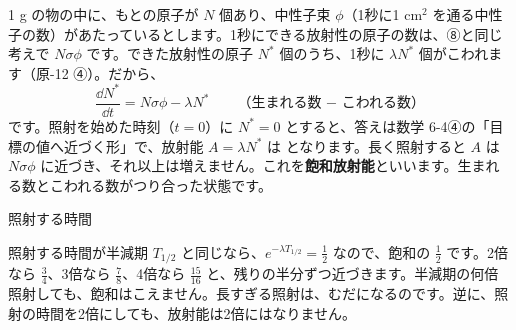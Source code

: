 1 g の物の中に、もとの原子が $N$ 個あり、中性子束 $\phi$（1秒に1 cm$^2$ を通る中性子の数）があたっているとします。1秒にできる放射性の原子の数は、⑧と同じ考えで $N\sigma\phi$ です。できた放射性の原子 $N^*$ 個のうち、1秒に $\lambda N^*$ 個がこわれます（原-12 ④）。だから、
\[ \frac{\dd N^*}{\dd t}=N\sigma\phi-\lambda N^* \qquad\text{（生まれる数 − こわれる数）} \]
です。照射を始めた時刻（$t=0$）に $N^*=0$ とすると、答えは数学 6-4④の「目標の値へ近づく形」で、放射能 $A=\lambda N^*$ は
\label{ph:原-13:hoshaka}となります。長く照射すると $A$ は $N\sigma\phi$ に近づき、それ以上は増えません。これを\textbf{飽和放射能}といいます。生まれる数とこわれる数がつり合った状態です。

\begin{phflow}
\end{phflow}

\begin{phbaisuru}[何倍にしても]{照射する時間}
\noindent\begin{minipage}[c]{0.45\linewidth}\raggedright
照射する時間が半減期 $T_{1/2}$ と同じなら、$e^{-\lambda T_{1/2}}=\tfrac12$ なので、飽和の $\tfrac12$ です。2倍なら $\tfrac34$、3倍なら $\tfrac78$、4倍なら $\tfrac{15}{16}$ と、残りの半分ずつ近づきます。半減期の何倍照射しても、飽和はこえません。長すぎる照射は、むだになるのです。逆に、照射の時間を2倍にしても、放射能は2倍にはなりません。
\end{minipage}\hfill
\begin{minipage}[c]{0.52\linewidth}\centering
{}
\end{minipage}
\end{phbaisuru}

